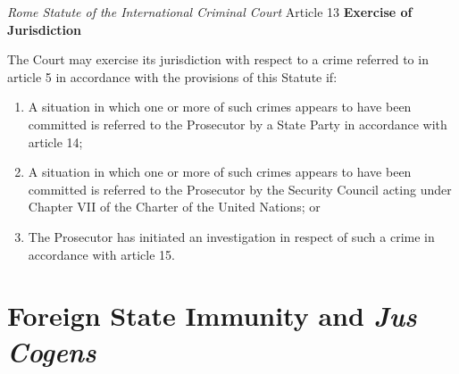 \begin{statutedetails}{\textit{Rome Statute of the International Criminal Court} Article 13}
    \flushleft
    \textbf{Exercise of Jurisdiction}

    \vspace{\baselineskip}

    The Court may exercise its jurisdiction with respect to a crime referred to in article 5 in  accordance with the provisions of this Statute if: 
    \begin{enumerate}[label=(\alph*)]
        \item A situation in which one or more of such crimes appears to have been committed is referred to the Prosecutor by a State Party in accordance with article 14; 
        \item A situation in which one or more of such crimes appears to have been committed is referred to the Prosecutor by the Security Council acting under Chapter VII of the Charter of the United Nations; or 
        \item The Prosecutor has initiated an investigation in respect of such a crime in accordance with article 15.
    \end{enumerate}
\end{statutedetails}

\section{Foreign State Immunity and \textit{Jus Cogens}}

